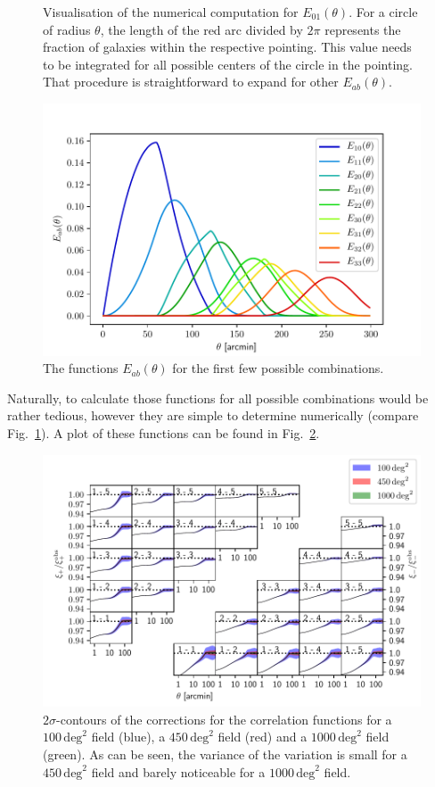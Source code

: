 \documentclass{aa}
\renewcommand{\rm}{\mathrm}
\begin{document}
\begin{appendix}
\begin{figure}
\centering
\sidecaption
\hspace*{1cm}
\def\svgwidth{140pt}

\caption[Visualisation of the numerical computation for $E_{01}(\theta)$.]{Visualisation of the numerical computation for $E_{01}(\theta)$. For a circle of radius $\theta$, the length of the red arc divided by $2\pi$ represents the fraction of galaxies within the respective pointing. This value needs to be integrated for all possible centers of the circle in the pointing. That procedure is straightforward to expand for other $E_{ab}(\theta)$.}
\label{fig:eoftheta_sim}
\end{figure}

\begin{figure}
\centering
\sidecaption
\includegraphics[width = 0.6\linewidth]{images/eab.pdf}
\caption{The functions $E_{ab}(\theta)$ for the first few possible combinations.}
\label{fig:eab}
\end{figure}
Naturally, to calculate those functions for all possible combinations would be rather tedious, however they are simple to determine numerically (compare Fig.~\ref{fig:eoftheta_sim}). A plot of these functions can be found in Fig.~\ref{fig:eab}.

\begin{figure}
\centering
\includegraphics[width=0.9\linewidth]{images/finite_footprint.pdf}
\caption{$2\sigma$-contours of the corrections for the correlation functions for a $100\,\rm{deg}^2$ field (blue), a $450\,\rm{deg}^2$ field (red) and a $1000\,\rm{deg}^2$ field (green). As can be seen, the variance of the variation is small for a $450\,\rm{deg}^2$ field and barely noticeable for a $1000\,\rm{deg}^2$ field.}
\label{fig:finite_footprint}
\end{figure}


\end{appendix}
\end{document}
